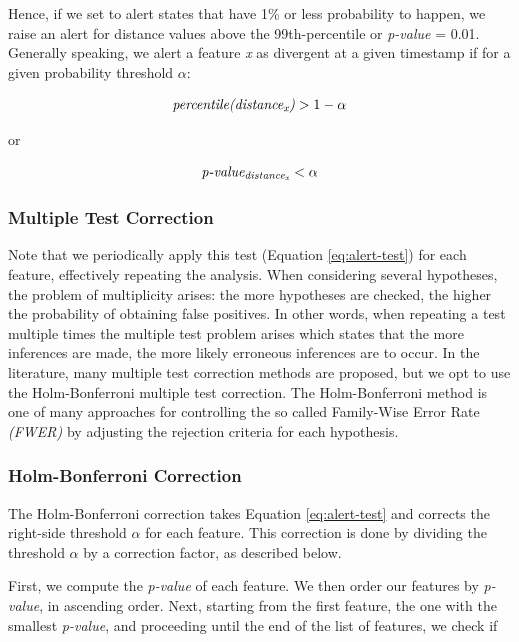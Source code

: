 Hence, if we set to alert states that have 1\% or less probability to happen, we raise an alert for distance values above the 99th-percentile or \textit{p-value} = 0.01. Generally speaking, we alert a feature \textit{x} as divergent at a given timestamp if for a given probability threshold $\alpha$:

\[ \textit{percentile(distance\textsubscript{x})} > 1 - \alpha \]

or

\begin{equation}
    \label{eq:alert-test}
    \textit{p-value\textsubscript{distance\textsubscript{x}}} < \alpha
\end{equation}

\subsubsection*{Multiple Test Correction} \label{sec:multi-test}
Note that we periodically apply this test (Equation \ref{eq:alert-test}) for each feature, effectively repeating the analysis. When considering several hypotheses, the problem of multiplicity arises: the more hypotheses are checked, the higher the probability of obtaining false positives. In other words, when repeating a test multiple times the multiple test problem arises which states that the more inferences are made, the more likely erroneous inferences are to occur. In the literature, many multiple test correction methods are proposed, but we opt to use the Holm-Bonferroni multiple test correction. The Holm-Bonferroni method is one of many approaches for controlling the so called Family-Wise Error Rate \textit{(FWER)} by adjusting the rejection criteria for each hypothesis.


\subsubsection*{Holm-Bonferroni Correction} \label{sec:holmbonferroni}
The Holm-Bonferroni correction takes Equation \ref{eq:alert-test} and corrects the right-side threshold $\alpha$ for each feature. This correction is done by dividing the threshold $\alpha$ by a correction factor, as described below.

First, we compute the \textit{p-value} of each feature. We then order our features by \textit{p-value}, in ascending order. Next, starting from the first feature, the one with the smallest \textit{p-value}, and proceeding until the end of the list of features, we check if

